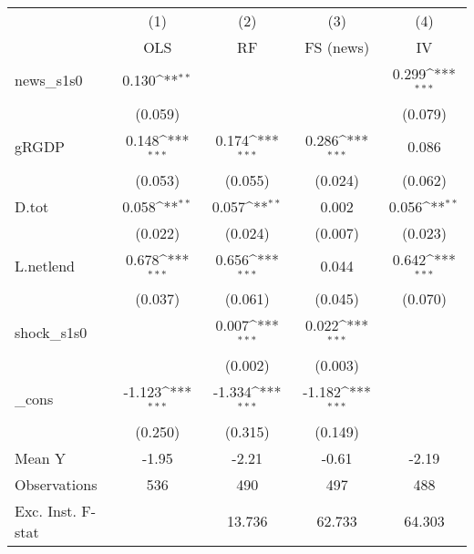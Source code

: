 {
\def\sym#1{\ifmmode^{#1}\else\(^{#1}\)\fi}
\begin{tabular}{l*{4}{c}}
\toprule
            &\multicolumn{1}{c}{(1)}&\multicolumn{1}{c}{(2)}&\multicolumn{1}{c}{(3)}&\multicolumn{1}{c}{(4)}\\
            &\multicolumn{1}{c}{OLS}&\multicolumn{1}{c}{RF}&\multicolumn{1}{c}{FS (news)}&\multicolumn{1}{c}{IV}\\
\midrule
news\_s1s0   &       0.130\sym{**} &                     &                     &       0.299\sym{***}\\
            &     (0.059)         &                     &                     &     (0.079)         \\
\addlinespace
gRGDP       &       0.148\sym{***}&       0.174\sym{***}&       0.286\sym{***}&       0.086         \\
            &     (0.053)         &     (0.055)         &     (0.024)         &     (0.062)         \\
\addlinespace
D.tot       &       0.058\sym{**} &       0.057\sym{**} &       0.002         &       0.056\sym{**} \\
            &     (0.022)         &     (0.024)         &     (0.007)         &     (0.023)         \\
\addlinespace
L.netlend   &       0.678\sym{***}&       0.656\sym{***}&       0.044         &       0.642\sym{***}\\
            &     (0.037)         &     (0.061)         &     (0.045)         &     (0.070)         \\
\addlinespace
shock\_s1s0  &                     &       0.007\sym{***}&       0.022\sym{***}&                     \\
            &                     &     (0.002)         &     (0.003)         &                     \\
\addlinespace
\_cons      &      -1.123\sym{***}&      -1.334\sym{***}&      -1.182\sym{***}&                     \\
            &     (0.250)         &     (0.315)         &     (0.149)         &                     \\
\midrule
Mean Y      &       -1.95         &       -2.21         &       -0.61         &       -2.19         \\
Observations&         536         &         490         &         497         &         488         \\
Exc. Inst. F-stat&                     &      13.736         &      62.733         &      64.303         \\
\bottomrule
\end{tabular}
}
